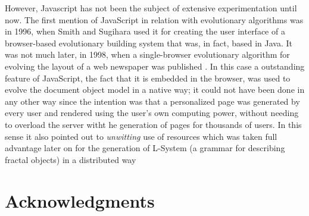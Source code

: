 \documentclass{sig-alternate}
\begin{document}
However, Javascript has not been the subject of extensive
experimentation until now. The first mention of JavaScript in relation
with evolutionary algorithms was in 1996, when Smith and Sugihara
\cite{smith1996ga} used it for creating the user interface of a
browser-based evolutionary building system that was, in fact, based in
Java. It was not much later, in 1998, when a single-browser
evolutionary algorithm for evolving the layout of a web newspaper was
published \cite{jj-ppsn98}. In this case a outstanding feature of
JavaScript, the fact that it is embedded in the browser, was used to
evolve the document object model in a native way; it could not have
been done in any other way since the intention was that a personalized
page was generated by every user and rendered using the user's own
computing power, without needing to overload the server witht he
generation of pages for thousands of users. In this sense it also
pointed out to {\em unwitting} \cite{klein2007unwitting} use of resources which was taken full
advantage later on for the generation of L-System (a grammar for
describing fractal objects) in a distributed way \cite{langdon2004global}


\section{Acknowledgments}


%

\end{document}

